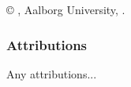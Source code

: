 \hypersetup{pageanchor=false} %
\thispagestyle{empty}
{\small
\strut\vfill
\noindent \copyright{} \groupname{}, Aalborg University, \MakeLowercase{\projectperiod{}}.\par
\vspace{0.3cm}
\subsubsection*{Attributions}
Any attributions...
}
\clearpage
\hypersetup{pageanchor=true} %